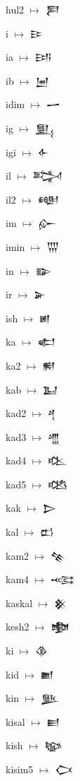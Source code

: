 {\noindent hul2 $\mapsto$ {\cufont 𒄾}\par
\noindent i $\mapsto$ {\cufont 𒄿}\par
\noindent ia $\mapsto$ {\cufont 𒅀}\par
\noindent ib $\mapsto$ {\cufont 𒅁}\par
\noindent idim $\mapsto$ {\cufont 𒅂}\par
\noindent ig $\mapsto$ {\cufont 𒅅}\par
\noindent igi $\mapsto$ {\cufont 𒅆}\par
\noindent il $\mapsto$ {\cufont 𒅋}\par
\noindent il2 $\mapsto$ {\cufont 𒅍}\par
\noindent im $\mapsto$ {\cufont 𒅎}\par
\noindent imin $\mapsto$ {\cufont 𒅓}\par
\noindent in $\mapsto$ {\cufont 𒅔}\par
\noindent ir $\mapsto$ {\cufont 𒅕}\par
\noindent ish $\mapsto$ {\cufont 𒅖}\par
\noindent ka $\mapsto$ {\cufont 𒅗}\par
\noindent ka2 $\mapsto$ {\cufont 𒆍}\par
\noindent kab $\mapsto$ {\cufont 𒆏}\par
\noindent kad2 $\mapsto$ {\cufont 𒆐}\par
\noindent kad3 $\mapsto$ {\cufont 𒆑}\par
\noindent kad4 $\mapsto$ {\cufont 𒆒}\par
\noindent kad5 $\mapsto$ {\cufont 𒆓}\par
\noindent kak $\mapsto$ {\cufont 𒆕}\par
\noindent kal $\mapsto$ {\cufont 𒆗}\par
\noindent kam2 $\mapsto$ {\cufont 𒆚}\par
\noindent kam4 $\mapsto$ {\cufont 𒆛}\par
\noindent kaskal $\mapsto$ {\cufont 𒆜}\par
\noindent kesh2 $\mapsto$ {\cufont 𒆟}\par
\noindent ki $\mapsto$ {\cufont 𒆠}\par
\noindent kid $\mapsto$ {\cufont 𒆤}\par
\noindent kin $\mapsto$ {\cufont 𒆥}\par
\noindent kisal $\mapsto$ {\cufont 𒆦}\par
\noindent kish $\mapsto$ {\cufont 𒆧}\par
\noindent kisim5 $\mapsto$ {\cufont 𒆨}\par
}
